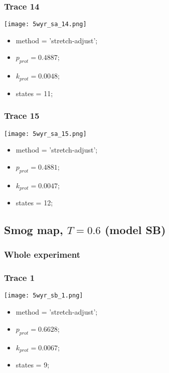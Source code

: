 \subsubsection{Trace 14}
\begin{minipage}[c]{0.7\textwidth}
    \texttt{[image: 5wyr\_sa\_14.png]}
\end{minipage}
\hfill
\begin{minipage}[c]{0.45\textwidth}
    \begin{itemize}
        \item method = 'stretch-adjust';
        \item $p_{prot}=0.4887$;
        \item $k_{prot}=0.0048$;
        \item states = 11;
    \end{itemize}
\end{minipage}

\subsubsection{Trace 15}
\begin{minipage}[c]{0.7\textwidth}
    \texttt{[image: 5wyr\_sa\_15.png]}
\end{minipage}
\hfill
\begin{minipage}[c]{0.45\textwidth}
    \begin{itemize}
        \item method = 'stretch-adjust';
        \item $p_{prot}=0.4881$;
        \item $k_{prot}=0.0047$;
        \item states = 12;
    \end{itemize}
\end{minipage}

\subsection{Smog map, $T=0.6$ (model SB)}
\subsubsection{Whole experiment}

\subsubsection{Trace 1}
\begin{minipage}[c]{0.7\textwidth}
    \texttt{[image: 5wyr\_sb\_1.png]}
\end{minipage}
\hfill
\begin{minipage}[c]{0.45\textwidth}
    \begin{itemize}
        \item method = 'stretch-adjust';
        \item $p_{prot}=0.6628$;
        \item $k_{prot}=0.0067$;
        \item states = 9;
    \end{itemize}
\end{minipage}

